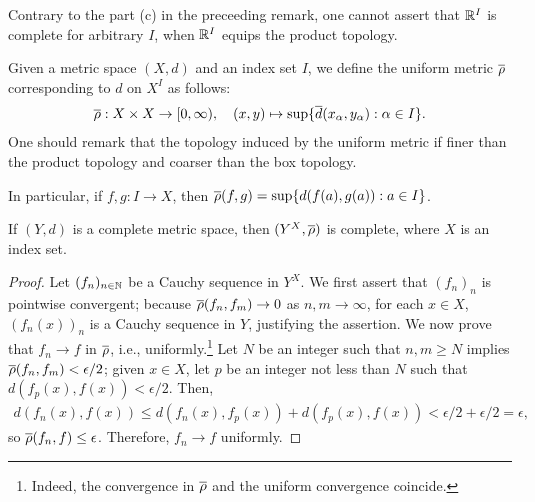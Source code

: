Contrary to the part (c) in the preceeding remark, one cannot assert that ${\mathbb{R}}^I$ is complete for arbitrary $I$, when ${\mathbb{R}}^I$ equips the product topology.
\begin{defi}
    Given a metric space $(X, d)$ and an index set $I$, we define the uniform metric $\overline{\rho}$ corresponding to $d$ on $X^I$ as follows:
    \begin{align*}
        \overline{\rho}: X\times X\rightarrow [0, \infty),\quad (x, y)\mapsto \sup \{\overline{d}(x_\alpha, y_\alpha):\alpha\in I\}.
    \end{align*}
    One should remark that the topology induced by the uniform metric if finer than the product topology and coarser than the box topology.
\end{defi}
In particular, if $f, g: I\rightarrow X$, then $\overline{\rho}(f, g)=\sup\{d(f(a), g(a)): a\in I\}$.

\begin{thm}
    If $(Y, d)$ is a complete metric space, then $(Y^X, \overline{\rho})$ is complete, where $X$ is an index set.
\end{thm}
\begin{proof}
    Let $(f_n)_{n\in{\mathbb{N}}}$ be a Cauchy sequence in $Y^X$.
    We first assert that $(f_n)_n$ is pointwise convergent; because $\overline{\rho}(f_n, f_m)\rightarrow 0$ as $n, m\rightarrow\infty$, for each $x\in X$, $(f_n(x))_n$ is a Cauchy sequence in $Y$, justifying the assertion.
    We now prove that $f_n\rightarrow f$ in $\overline{\rho}$, i.e., uniformly.\footnote{Indeed, the convergence in $\overline{\rho}$ and the uniform convergence coincide.}
    Let $N$ be an integer such that $n, m\geq N$ implies $\overline{\rho}(f_n, f_m)<\epsilon/2$; given $x\in X$, let $p$ be an integer not less than $N$ such that $d(f_p(x), f(x))<\epsilon/2$.
    Then,
    \begin{align}
        d(f_n(x), f(x))\leq d(f_n(x), f_p(x))+d(f_p(x), f(x))<\epsilon/2+\epsilon/2=\epsilon,
    \end{align}
    so $\overline{\rho}(f_n, f)\leq\epsilon$.
    Therefore, $f_n\rightarrow f$ uniformly.
\end{proof}


